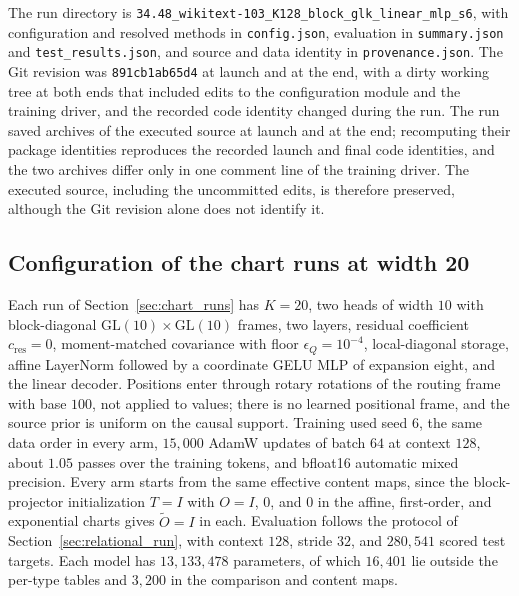 \documentclass[twoside,11pt]{article}
\begin{document}
The run directory is \texttt{34.48\_\allowbreak wikitext-103\_\allowbreak K128\_\allowbreak block\_\allowbreak glk\_\allowbreak linear\_\allowbreak mlp\_\allowbreak s6}, with configuration and resolved methods in \texttt{config.json}, evaluation in \texttt{summary.json} and \texttt{test\_\allowbreak results.json}, and source and data identity in \texttt{provenance.json}. The Git revision was \texttt{891cb1ab65d4} at launch and at the end, with a dirty working tree at both ends that included edits to the configuration module and the training driver, and the recorded code identity changed during the run. %
The run saved archives of the executed source at launch and at the end; recomputing their package identities reproduces the recorded launch and final code identities, and the two archives differ only in one comment line of the training driver. %
The executed source, including the uncommitted edits, is therefore preserved, although the Git revision alone does not identify it.

\subsection{Configuration of the chart runs at width 20}
\label{app:chart_run_configuration}

Each run of Section~\ref{sec:chart_runs} has $K=20$, two heads of width $10$ with block-diagonal $\mathrm{GL}(10)\times\mathrm{GL}(10)$ frames, two layers, residual coefficient $c_{\mathrm{res}}=0$, moment-matched covariance with floor $\epsilon_Q=10^{-4}$, local-diagonal storage, affine LayerNorm followed by a coordinate GELU MLP of expansion eight, and the linear decoder. Positions enter through rotary rotations of the routing frame with base $100$, not applied to values; there is no learned positional frame, and the source prior is uniform on the causal support. Training used seed 6, the same data order in every arm, $15{,}000$ AdamW updates of batch $64$ at context $128$, about $1.05$ passes over the training tokens, and bfloat16 automatic mixed precision. Every arm starts from the same effective content maps, since the block-projector initialization $T=I$ with $O=I$, $0$, and $0$ in the affine, first-order, and exponential charts gives $\widetilde O=I$ in each. Evaluation follows the protocol of Section~\ref{sec:relational_run}, with context $128$, stride $32$, and $280{,}541$ scored test targets. Each model has $13{,}133{,}478$ parameters, of which $16{,}401$ lie outside the per-type tables and $3{,}200$ in the comparison and content maps.
\end{document}

